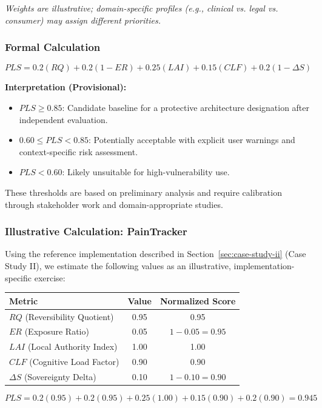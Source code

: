 \documentclass[12pt]{article}
\begin{document}
\textit{Weights are illustrative; domain-specific profiles (e.g., clinical vs. legal vs. consumer) may assign different priorities.}

\subsubsection{Formal Calculation}
\[
PLS = 0.2(RQ) + 0.2(1-ER) + 0.25(LAI) + 0.15(CLF) + 0.2(1-\Delta S)
\]

\textbf{Interpretation (Provisional):}
\begin{itemize}
\item $PLS \ge 0.85$: Candidate baseline for a protective architecture designation after independent evaluation.
\item $0.60 \le PLS < 0.85$: Potentially acceptable with explicit user warnings and context-specific risk assessment.
\item $PLS < 0.60$: Likely unsuitable for high-vulnerability use.
\end{itemize}
These thresholds are based on preliminary analysis and require calibration through stakeholder work and domain-appropriate studies.

\subsubsection{Illustrative Calculation: PainTracker}
Using the reference implementation described in Section~\ref{sec:case-study-ii} (Case Study II), we estimate the following values as an illustrative, implementation-specific exercise:

\begin{center}
\begin{tabular}{@{}lcc@{}}
\toprule
Metric & Value & Normalized Score \\
\midrule
$RQ$ (Reversibility Quotient) & 0.95 & 0.95 \\
$ER$ (Exposure Ratio) & 0.05 & $1 - 0.05 = 0.95$ \\
$LAI$ (Local Authority Index) & 1.00 & 1.00 \\
$CLF$ (Cognitive Load Factor) & 0.90 & 0.90 \\
$\Delta S$ (Sovereignty Delta) & 0.10 & $1 - 0.10 = 0.90$ \\
\bottomrule
\end{tabular}
\end{center}

\[
PLS = 0.2(0.95) + 0.2(0.95) + 0.25(1.00) + 0.15(0.90) + 0.2(0.90) = 0.945
\]
\end{document}
